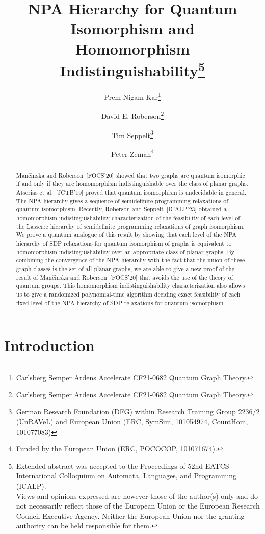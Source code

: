 \documentclass[11pt,a4paper]{article}
\title{NPA Hierarchy for Quantum Isomorphism and\\ Homomorphism Indistinguishability\thanks{Extended abstract was accepted to the Proceedings of 52nd EATCS International Colloquium on Automata, Languages, and Programming (ICALP).\\Views and opinions expressed are however those of the author(s) only and do not necessarily reflect those of the European Union or the European Research Council Executive Agency. Neither the European Union nor the granting authority can be held responsible for them.}}
\date{}
\author[1]{Prem Nigam Kar\thanks{Carlsberg Semper Ardens Accelerate CF21-0682 Quantum Graph
Theory.}}
\author[1, 2]{David E. Roberson\thanks{Carlsberg Semper Ardens Accelerate CF21-0682 Quantum Graph
Theory.}}
\author[3]{Tim Seppelt\thanks{German Research Foundation (DFG) within Research Training Group 2236/2 (UnRAVeL) and
European Union (ERC, SymSim, 101054974, CountHom, 101077083)}}
\author[4]{Peter Zeman\thanks{Funded by the European Union (ERC, POCOCOP, 101071674).}}
\affil[1]{Technical University of Denmark}
\affil[2]{QMATH, University of Copenhagen}
\affil[3]{IT-Universitetet i København}
\affil[4]{Department of Algebra\\ Faculty of Mathematics and Physics\\ Charles University}
\theoremstyle{plain}
\theoremstyle{remark}
\theoremstyle{definition}
\begin{document}
\maketitle

\begin{abstract}
    Mančinska and Roberson~[FOCS'20] showed that two graphs are quantum isomorphic if and only if they are homomorphism indistinguishable over the class of planar graphs. Atserias et al.~[JCTB'19] proved that quantum isomorphism is undecidable in general. The NPA hierarchy gives a sequence of semidefinite programming relaxations of quantum isomorphism. Recently, Roberson and Seppelt~[ICALP'23] obtained a homomorphism indistinguishability characterization of the feasibility of each level of the Lasserre hierarchy of semidefinite programming relaxations of graph isomorphism. We prove a quantum analogue of this result by showing that each level of the NPA hierarchy of SDP relaxations for quantum isomorphism of graphs is equivalent to homomorphism indistinguishability over an appropriate class of planar graphs. By combining the convergence of the NPA hierarchy with the fact that the union of these graph classes is the set of all planar graphs, we are able to give a new proof of the result of Mančinska and Roberson~[FOCS'20] that avoids the use of the theory of quantum groups. This homomorphism indistinguishability characterization also allows us to give a randomized polynomial-time algorithm deciding exact feasibility of each fixed level of the NPA hierarchy of SDP relaxations for quantum isomorphism.
\end{abstract}



\tableofcontents 




\section{Introduction}
\end{document}
